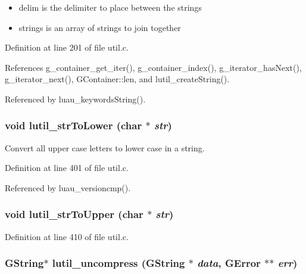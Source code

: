 \begin{itemize}
\item delim is the delimiter to place between the strings \item strings is an array of strings to join together 
\end{itemize}


Definition at line 201 of file util.c.

References g\_\-container\_\-get\_\-iter(), g\_\-container\_\-index(), g\_\-iterator\_\-has\-Next(), g\_\-iterator\_\-next(), GContainer::len, and lutil\_\-create\-String().

Referenced by luau\_\-keywords\-String().
\subsubsection{\setlength{\rightskip}{0pt plus 5cm}void lutil\_\-str\-To\-Lower (char $\ast$ {\em str})}\label{util_8h_a21}


Convert all upper case letters to lower case in a string. 



Definition at line 401 of file util.c.

Referenced by luau\_\-versioncmp().
\subsubsection{\setlength{\rightskip}{0pt plus 5cm}void lutil\_\-str\-To\-Upper (char $\ast$ {\em str})}\label{util_8h_a22}




Definition at line 410 of file util.c.
\subsubsection{\setlength{\rightskip}{0pt plus 5cm}GString$\ast$ lutil\_\-uncompress (GString $\ast$ {\em data}, GError $\ast$$\ast$ {\em err})}\label{util_8h_a25}




